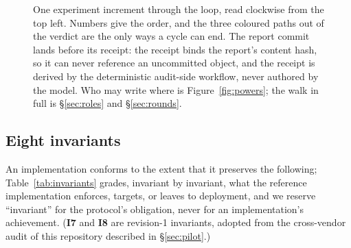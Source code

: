 \documentclass[11pt,letterpaper]{article}
\newcommand{\invariant}[1]{\textbf{I#1}}
\begin{document}
\begin{figure}[!tp]
{}
\caption{One experiment increment through the loop, read clockwise from the top left. Numbers give the order, and the three coloured paths out of the verdict are the only ways a cycle can end. The report commit lands before its receipt: the receipt binds the report's content hash, so it can never reference an uncommitted object, and the receipt is derived by the deterministic audit-side workflow, never authored by the model. Who may write where is Figure~\ref{fig:powers}; the walk in full is \S\ref{sec:roles} and \S\ref{sec:rounds}.}
\label{fig:arch}
\end{figure}

\subsection{Eight invariants}\label{sec:invariants}

An implementation conforms to the extent that it preserves the following; Table~\ref{tab:invariants} grades, invariant by invariant, what the reference implementation enforces, targets, or leaves to deployment, and we reserve ``invariant'' for the protocol's obligation, never for an implementation's achievement. (\invariant{7} and \invariant{8} are revision-1 invariants, adopted from the cross-vendor audit of this repository described in \S\ref{sec:pilot}.)
\end{document}
